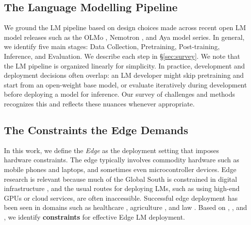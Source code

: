 \documentclass[11pt,a4paper]{article}
\begin{document}
\subsection{The Language Modelling Pipeline}
\label{sec:lm_pipeline}

We ground the LM pipeline based on design choices made across recent open LM model releases such as the
OLMo \citep{walsh2025,olmo2025olmo3},
Nemotron \citep{nvidia2025nvidianemotronnano2,nvidia2025nvidianemotron3efficient}, and Aya \citep{ustun-etal-2024-aya,dang2024ayaexpansecombiningresearch,salamanca2026tinyayabridgingscale} model series.
In general, we identify five main stages: Data Collection, Pretraining, Post-training, Inference, and Evaluation.
We describe each step in \S\ref{sec:survey}.
We note that the LM pipeline is organized linearly for simplicity.
In practice, development and deployment decisions often overlap: an LM developer might
skip pretraining and start from an open-weight base model, or
evaluate iteratively during development before deploying a model for inference.
Our survey of challenges and methods recognizes this and reflects these nuances whenever appropriate.

\subsection{The Constraints the Edge Demands}
\label{sec:edge_constraints}

In this work, we define the \textit{Edge} as the deployment setting that imposes hardware constraints.
The edge typically involves commodity hardware such as mobile phones and laptops, and sometimes even microcontroller devices.
Edge research is relevant because much of the Global South is constrained in digital infrastructure \citep{GSMA2025MobileEconomy,occhini2026artificialintelligencecreatingnew}, and the usual routes for deploying LMs, such as using high-end GPUs or cloud services, are often inaccessible.
Successful edge deployment has been seen in domains such as healthcare \citep{hu-etal-2025-nlp-public-health-africa,rutunda-etal-2026-large}, agriculture \citep{singh2024farmerchatscalingaipoweredagricultural,samuel2025agroLLMconnectingfarmersagricultural}, and law \citep{ariai-etal-2025-nlp-legal-domain}.
Based on \citet{treviso-etal-2023-efficient}, \citet{lu-etal-2025-demystifying}, and \citet{zheng2025reviewedgeLLM}, we identify \textbf{constraints} for effective Edge LM deployment.
\end{document}
